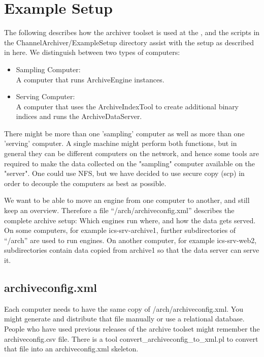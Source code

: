 \chapter{Example Setup} \label{ch:examplesetup}
The following describes how the archiver toolset is used at the
, and the scripts in
the ChannelArchiver/ExampleSetup directory assist with the
setup as described in here.
We distinguish between two types of computers:
\begin{itemize}
\item Sampling Computer:\\
      A computer that runs ArchiveEngine instances.
\item Serving Computer:\\
      A computer that uses the ArchiveIndexTool to create
      additional binary indices and runs the ArchiveDataServer.
\end{itemize}

\noindent There might be more than one 'sampling' computer as well as more
than one 'serving' computer.
A single machine might perform both functions, but in general
they can be different computers on the network, and hence
some tools are required to make the data collected on the
"sampling" computer available on the "server".
One could use NFS, but we have decided to use secure copy
(scp) in order to decouple the computers as best as possible.

We want to be able to move an engine from one computer to another,
and still keep an overview.
Therefore a file ``/arch/archiveconfig.xml'' describes the complete
archive setup: Which engines run where, and how the data gets served.
On some computers, for example ics-srv-archive1, further subdirectories of ``/arch''
are used to run engines.
On another computer, for example ics-srv-web2, subdirectories
contain data copied from archive1 so that the data server
can serve it.

\section{archiveconfig.xml}
Each computer needs to have the same copy of /arch/archiveconfig.xml.
You might generate and distribute that file manually
or use a relational database.
People who have used previous releases of the archive toolset might
remember the archiveconfig.csv file. There is a tool
convert\_archiveconfig\_to\_xml.pl to convert that file
into an archiveconfig.xml skeleton.

